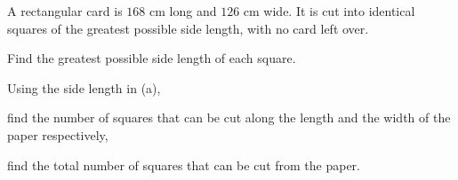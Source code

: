  A rectangular card is $168$ cm long and $126$ cm wide. It is cut into identical squares of the greatest possible side length, with no card left over.

\begin{subparts}
  \item Find the greatest possible side length of each square.
  \item Using the side length in (a),
  \begin{subpartsii}
    \item find the number of squares that can be cut along the length and the width of the paper respectively,
    \item find the total number of squares that can be cut from the paper.
  \end{subpartsii}
\end{subparts}


